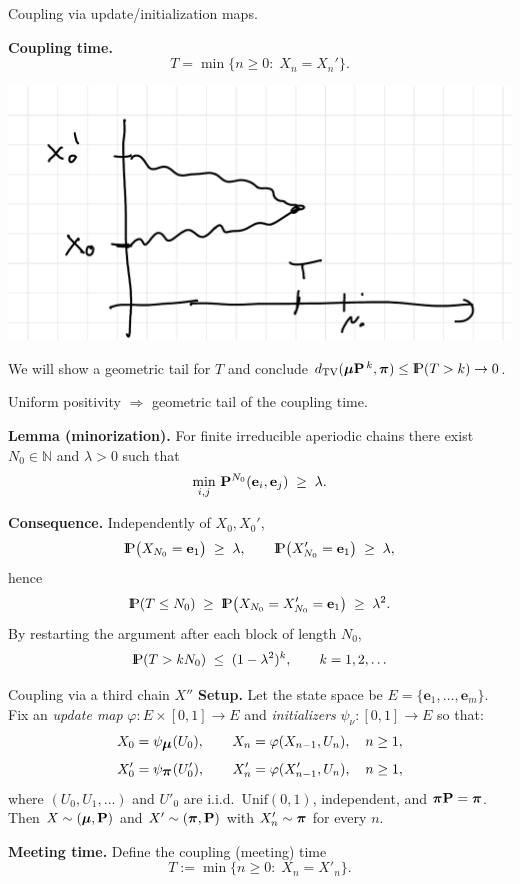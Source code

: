 \documentclass[aspectratio=169]{beamer}
\newcommand{\Prob}{{\rm I\hspace{-0.8mm}P}}
\newcommand{\e}[0]{\textbf{e}}
\begin{document}
\begin{frame}{Coupling via update/initialization maps.}


\textbf{Coupling time.}
\[
T=\min\{n\ge0:\;X_n=X_n'\}.
\]

\begin{center}
\includegraphics[width=0.6\linewidth]{pics/coupling_indep.png}
\end{center}

We will show a geometric tail for \(T\) and conclude \(d_{\rm TV}(\bfmu\bfP^{\,k},\bfpi)\le \Prob(T>k)\to0\).
\end{frame}



\begin{frame}{Uniform positivity $\Rightarrow$ geometric tail of the coupling time.}

\textbf{Lemma (minorization).}
For finite irreducible aperiodic chains there exist \(N_0\in\mathbb{N}\) and \(\lambda>0\) such that
\[
\min_{i,j}\,\bfP^{N_0}(\e_i,\e_j)\;\ge\;\lambda.
\]

\textbf{Consequence.}
Independently of \(X_0,X_0'\),
\[
\Prob\big(X_{N_0}=\e_1\big)\;\ge\;\lambda,\qquad
\Prob\big(X_{N_0}'=\e_1\big)\;\ge\;\lambda,
\]
hence
\[
\Prob(T\le N_0)\;\ge\;\Prob\big(X_{N_0}=X_{N_0}'=\e_1\big)\;\ge\;\lambda^2.
\]
By restarting the argument after each block of length \(N_0\),
\[
\Prob(T>kN_0)\;\le\;(1-\lambda^2)^{k},\qquad k=1,2,\ldots
\]

\end{frame}


 \begin{frame}{Coupling via a third chain \(X''\)}
\small
\textbf{Setup.} Let the state space be \(E=\{\e_1,\ldots,\e_m\}\).
Fix an \emph{update map} \(\varphi:E\times[0,1]\to E\) and \emph{initializers} \(\psi_{\nu}:[0,1]\to E\) so that:
\[
X_0=\psi_{\mbox{\boldmath $\mu$}}(U_0),\qquad X_n=\varphi(X_{n-1},U_n),\quad n\ge1,
\]
\[
X'_0=\psi_{\mbox{\boldmath$\pi$}}(U'_0),\qquad X'_n=\varphi(X'_{n-1},U_n),\quad n\ge1,
\]
where \((U_0,U_1,\ldots)\) and \(U'_0\) are i.i.d.\ \(\mathrm{Unif}(0,1)\), independent, and \(\mbox{\boldmath$\pi$}\mathbf{P}=\mbox{\boldmath$\pi$}\).
Then \(X\sim(\mbox{\boldmath $\mu$},\mathbf{P})\) and \(X'\sim(\mbox{\boldmath$\pi$},\mathbf{P})\) with \(X'_n\sim\mbox{\boldmath$\pi$}\) for every \(n\).

\medskip
\textbf{Meeting time.} Define the coupling (meeting) time
\[
T:=\min\{n\ge0:\;X_n=X'_n\}.
\]

\end{frame}
\end{document}
